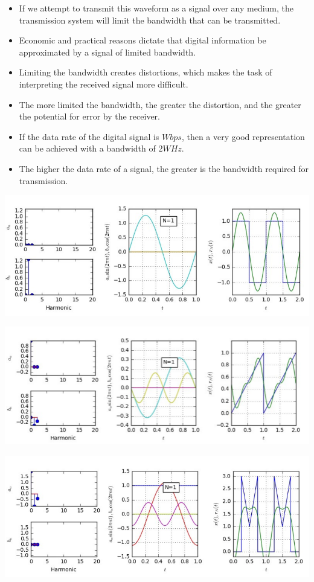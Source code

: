 \documentclass[11pt]{article}
\begin{document}
\begin{itemize}
    \item If we attempt to transmit this waveform as a signal over any medium, the transmission system will limit the bandwidth that can be transmitted.
    \item Economic and practical reasons dictate that digital information be approximated by a signal of limited bandwidth.
    \item Limiting the bandwidth creates distortions, which makes the task of interpreting the received signal more difficult.
    \item The more limited the bandwidth, the greater the distortion, and the greater the potential for error by the receiver.
    \item If the data rate of the digital signal is \(W bps\), then a very good representation can be achieved with a bandwidth of \(2W Hz\).
    \item The higher the data rate of a signal, the greater is the bandwidth required for transmission.
\end{itemize}

\includegraphics[width=\textwidth]{fourier-analysis-6}

\includegraphics[width=\textwidth]{fourier-analysis-7}

\includegraphics[width=\textwidth]{fourier-analysis-8}
\end{document}
